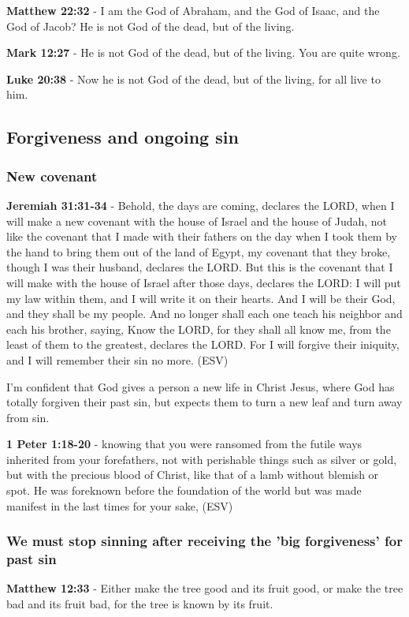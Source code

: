 \documentclass[11pt]{article}
\begin{document}
\textbf{Matthew 22:32} - I am the God of Abraham, and the God of Isaac, and the God of Jacob? He is not God of the dead, but of the living.

\textbf{Mark 12:27} - He is not God of the dead, but of the living. You are quite wrong.

\textbf{Luke 20:38} - Now he is not God of the dead, but of the living, for all live to him.

\subsection{Forgiveness and ongoing sin}
\label{sec:org295f4f0}
\subsubsection{New covenant}
\label{sec:org2fbecbb}
\textbf{Jeremiah 31:31-34} - Behold, the days are coming, declares the LORD, when I will make a new covenant with the house of Israel and the house of Judah, not like the covenant that I made with their fathers on the day when I took them by the hand to bring them out of the land of Egypt, my covenant that they broke, though I was their husband, declares the LORD. But this is the covenant that I will make with the house of Israel after those days, declares the LORD: I will put my law within them, and I will write it on their hearts. And I will be their God, and they shall be my people. And no longer shall each one teach his neighbor and each his brother, saying, Know the LORD, for they shall all know me, from the least of them to the greatest, declares the LORD. For I will forgive their iniquity, and I will remember their sin no more. (ESV)

I'm confident that God gives a person a new life in Christ Jesus, where God has totally forgiven their past sin,
but expects them to turn a new leaf and turn away from sin.

\textbf{1 Peter 1:18-20} - knowing that you were ransomed from the futile ways inherited from your forefathers, not with perishable things such as silver or gold, but with the precious blood of Christ, like that of a lamb without blemish or spot. He was foreknown before the foundation of the world but was made manifest in the last times for your sake, (ESV)

\subsubsection{We must stop sinning after receiving the 'big forgiveness' for past sin}
\label{sec:org914233a}
\textbf{Matthew 12:33} - Either make the tree good and its fruit good, or make the tree bad and its fruit bad, for the tree is known by its fruit.
\end{document}
